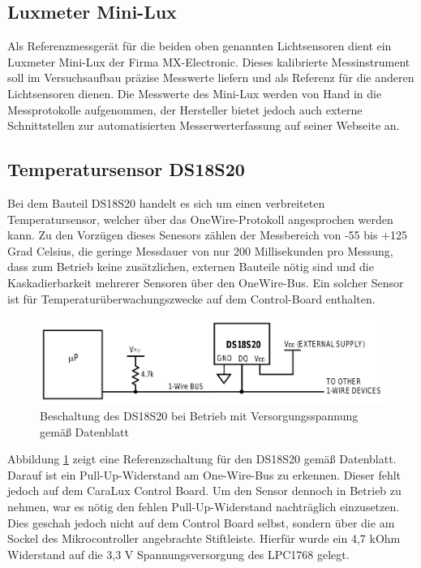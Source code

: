 \documentclass[a4paper,12pt]{scrartcl}
\begin{document}
\subsection{Luxmeter Mini-Lux}
Als Referenzmessgerät für die beiden oben genannten Lichtsensoren dient ein Luxmeter Mini-Lux der Firma MX-Electronic. Dieses kalibrierte Messinstrument soll im Versuchsaufbau präzise Messwerte liefern und als Referenz für die anderen Lichtsensoren dienen. Die Messwerte des Mini-Lux werden von Hand in die Messprotokolle aufgenommen, der Hersteller bietet jedoch auch externe Schnittstellen zur automatisierten Messerwerterfassung auf seiner Webseite an.\cite{specminilux}

\subsection{Temperatursensor DS18S20}
Bei dem Bauteil DS18S20 handelt es sich um einen verbreiteten Temperatursensor, welcher über das OneWire-Protokoll angesprochen werden kann. Zu den Vorzügen dieses Senesors zählen der Messbereich von -55 bis +125 Grad Celsius, die
geringe Messdauer von nur 200 Millisekunden pro Messung, dass zum Betrieb keine zusätzlichen, externen Bauteile nötig sind und die Kaskadierbarkeit mehrerer Sensoren über den OneWire-Bus.\cite{specds1820} Ein solcher Sensor ist für Temperaturüberwachungszwecke auf dem Control-Board enthalten.

\begin{figure}[H]
\begin{center}
\includegraphics[width=0.8\hsize]{./images/schaltung-ds18s20.png}
\end{center}
\caption{\label{fig:schaltungDs18s20}Beschaltung des DS18S20 bei Betrieb mit Versorgungsspannung gemäß Datenblatt \cite{specds1820}}
\end{figure}

Abbildung \ref{fig:schaltungDs18s20} zeigt eine Referenzschaltung für den DS18S20 gemäß Datenblatt. Darauf ist ein Pull-Up-Widerstand am One-Wire-Bus zu erkennen. Dieser fehlt jedoch auf dem CaraLux Control Board. Um den Sensor dennoch in Betrieb zu nehmen, war es nötig den fehlen Pull-Up-Widerstand nachträglich einzusetzen. Dies geschah jedoch nicht auf dem Control Board selbst, sondern über die am Sockel des Mikrocontroller angebrachte Stiftleiste. Hierfür wurde ein 4,7 kOhm Widerstand auf die 3,3 V Spannungsversorgung des LPC1768 gelegt.
\end{document}
